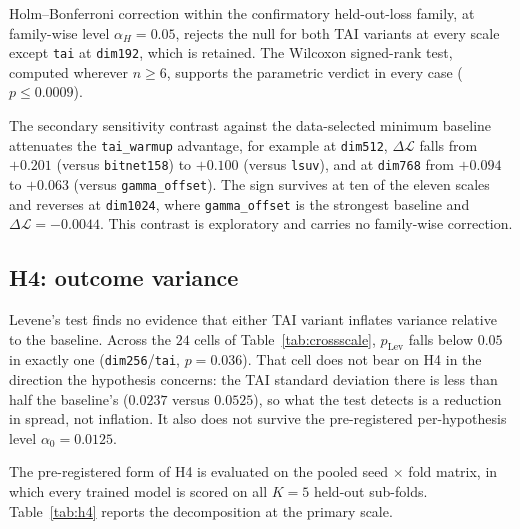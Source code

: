 \documentclass[final,5p,times,twocolumn]{elsarticle}
\theoremstyle{remark}
\newcommand{\dL}{\Delta\mathcal{L}}
\begin{document}
Holm--Bonferroni correction within the confirmatory held-out-loss family, at
family-wise level $\alpha_{H} = 0.05$, rejects the null for both TAI variants
at every scale except \texttt{tai} at \texttt{dim192}, which is retained. The Wilcoxon signed-rank test, computed
wherever $n \geq 6$, supports the parametric verdict in every case
($p \leq 0.0009$).

The secondary sensitivity contrast against the data-selected minimum baseline
attenuates the \texttt{tai\_warmup} advantage, for
example at \texttt{dim512}, $\dL$ falls from $+0.201$ (versus
\texttt{bitnet158}) to $+0.100$ (versus \texttt{lsuv}), and at \texttt{dim768}
from $+0.094$ to $+0.063$ (versus \texttt{gamma\_offset}). The sign survives at
ten of the eleven scales and reverses at \texttt{dim1024}, where
\texttt{gamma\_offset} is the strongest baseline and $\dL = -0.0044$. This contrast is
exploratory and carries no family-wise correction.

\subsection{H4: outcome variance}
\label{sec:res-h4}

Levene's test finds no evidence that either TAI variant inflates variance
relative to the baseline. Across the $24$ cells of Table~\ref{tab:crossscale},
$p_{\mathrm{Lev}}$ falls below $0.05$ in exactly one
(\texttt{dim256}/\texttt{tai}, $p = 0.036$). That cell does not bear on H4 in
the direction the hypothesis concerns: the TAI standard deviation there is
less than half the baseline's ($0.0237$ versus $0.0525$), so what the test
detects is a reduction in spread, not inflation. It also does not survive the
pre-registered per-hypothesis level $\alpha_{0} = 0.0125$.

The pre-registered form of H4 is evaluated on the pooled seed $\times$ fold
matrix, in which every trained model is scored on all $K=5$ held-out sub-folds.
Table~\ref{tab:h4} reports the decomposition at the primary scale.
\end{document}
